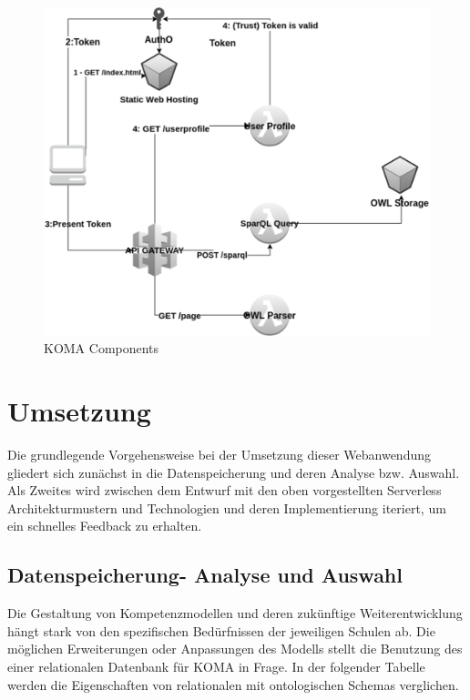 \documentclass[
12pt,
english,
ngerman,
headsepline,
twoside,
openright,
numbers=noenddot,version=first
]{scrreprt}
\begin{document}
\begin{figure}[H]
	\begin{center}
		\includegraphics[scale=0.60]{./pics/static-web-hosting.eps}
		\caption{KOMA Components}
		\label{pic:koma-components}
	\end{center}
\end{figure}

\section{Umsetzung}
\label{chap:impl}
Die grundlegende Vorgehensweise bei der Umsetzung dieser Webanwendung gliedert sich zunächst in die Datenspeicherung und deren Analyse bzw. Auswahl. Als Zweites wird zwischen dem Entwurf mit den oben vorgestellten Serverless Architekturmustern und Technologien und deren Implementierung iteriert, um ein schnelles Feedback zu erhalten.

\subsection{Datenspeicherung- Analyse und Auswahl}
Die Gestaltung von Kompetenzmodellen und deren zukünftige Weiterentwicklung hängt stark von den spezifischen Bedürfnissen der jeweiligen Schulen ab. Die möglichen Erweiterungen oder Anpassungen des Modells stellt die Benutzung des einer relationalen Datenbank für \acrshort{KOMA} in Frage. In der folgender Tabelle werden die Eigenschaften von relationalen mit ontologischen Schemas verglichen.
\end{document}
